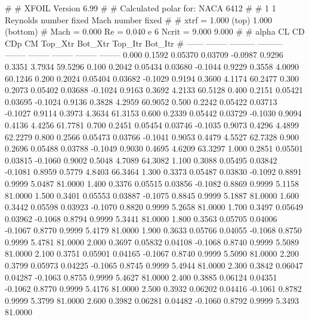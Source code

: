 #  
#       XFOIL         Version 6.99
#  
# Calculated polar for: NACA 6412                                       
#  
# 1 1 Reynolds number fixed          Mach number fixed         
#  
# xtrf =   1.000 (top)        1.000 (bottom)  
# Mach =   0.000     Re =     0.040 e 6     Ncrit =   9.000  9.000
#  
#   alpha    CL        CD       CDp       CM     Top_Xtr  Bot_Xtr  Top_Itr  Bot_Itr
#  ------ -------- --------- --------- -------- -------- -------- -------- --------
   0.000   0.1592   0.05370   0.03709  -0.0987   0.9296   0.3351   3.7934  59.5296
   0.100   0.2042   0.05434   0.03680  -0.1044   0.9229   0.3558   4.0090  60.1246
   0.200   0.2024   0.05404   0.03682  -0.1029   0.9194   0.3600   4.1174  60.2477
   0.300   0.2073   0.05402   0.03688  -0.1024   0.9163   0.3692   4.2133  60.5128
   0.400   0.2151   0.05421   0.03695  -0.1024   0.9136   0.3828   4.2959  60.9052
   0.500   0.2242   0.05422   0.03713  -0.1027   0.9114   0.3973   4.3634  61.3153
   0.600   0.2339   0.05442   0.03729  -0.1030   0.9094   0.4136   4.4256  61.7781
   0.700   0.2451   0.05454   0.03746  -0.1035   0.9073   0.4296   4.4899  62.2279
   0.800   0.2566   0.05473   0.03766  -0.1041   0.9053   0.4479   4.5527  62.7328
   0.900   0.2696   0.05488   0.03788  -0.1049   0.9030   0.4695   4.6209  63.3297
   1.000   0.2851   0.05501   0.03815  -0.1060   0.9002   0.5048   4.7089  64.3082
   1.100   0.3088   0.05495   0.03842  -0.1081   0.8959   0.5779   4.8403  66.3464
   1.300   0.3373   0.05487   0.03830  -0.1092   0.8891   0.9999   5.0487  81.0000
   1.400   0.3376   0.05515   0.03856  -0.1082   0.8869   0.9999   5.1158  81.0000
   1.500   0.3401   0.05553   0.03887  -0.1075   0.8845   0.9999   5.1887  81.0000
   1.600   0.3442   0.05598   0.03923  -0.1070   0.8820   0.9999   5.2658  81.0000
   1.700   0.3497   0.05649   0.03962  -0.1068   0.8794   0.9999   5.3441  81.0000
   1.800   0.3563   0.05705   0.04006  -0.1067   0.8770   0.9999   5.4179  81.0000
   1.900   0.3633   0.05766   0.04055  -0.1068   0.8750   0.9999   5.4781  81.0000
   2.000   0.3697   0.05832   0.04108  -0.1068   0.8740   0.9999   5.5089  81.0000
   2.100   0.3751   0.05901   0.04165  -0.1067   0.8740   0.9999   5.5090  81.0000
   2.200   0.3799   0.05973   0.04225  -0.1065   0.8745   0.9999   5.4944  81.0000
   2.300   0.3842   0.06047   0.04287  -0.1063   0.8755   0.9999   5.4627  81.0000
   2.400   0.3885   0.06124   0.04351  -0.1062   0.8770   0.9999   5.4176  81.0000
   2.500   0.3932   0.06202   0.04416  -0.1061   0.8782   0.9999   5.3799  81.0000
   2.600   0.3982   0.06281   0.04482  -0.1060   0.8792   0.9999   5.3493  81.0000
